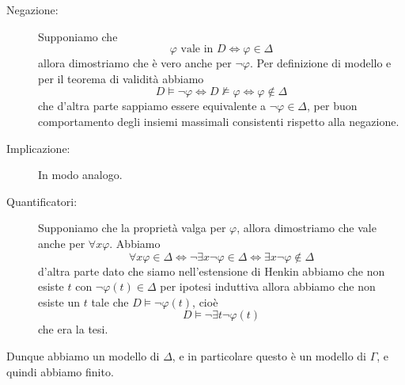 \documentclass[11pt]{scrartcl}
\begin{document}
 	\begin{description}
 		\item[Negazione:] Supponiamo che 
 		$$\varphi \text{ vale in } D \iff \varphi\in \Delta$$
 		allora dimostriamo che è vero anche per $\lnot\varphi$. Per definizione di modello e per il teorema di validità abbiamo
 		$$D\models \lnot\varphi \iff D\not\models \varphi \iff \varphi \not \in \Delta$$
 		che d'altra parte sappiamo essere equivalente a $\lnot\varphi\in \Delta$, per buon comportamento degli insiemi massimali consistenti rispetto alla negazione.
 		\item[Implicazione:] In modo analogo.
 		\item[Quantificatori:] Supponiamo che la proprietà valga per $\varphi$, allora dimostriamo che vale anche per $\forall x\varphi$. Abbiamo
 		$$\forall x\varphi \in \Delta\iff \lnot \exists x\lnot\varphi \in \Delta \iff \exists x\lnot\varphi \not\in \Delta$$
 		d'altra parte dato che siamo nell'estensione di Henkin abbiamo che non esiste $t$ con $\lnot\varphi(t)\in \Delta$ per ipotesi induttiva allora abbiamo che non esiste un $t$ tale che $D\models \lnot\varphi(t)$, cioè
 		$$D\models \lnot \exists t\lnot \varphi(t)$$
 		che era la tesi.
 	\end{description}
 	Dunque abbiamo un modello di $\Delta$, e in particolare questo è un modello di $\Gamma$, e quindi abbiamo finito.
\end{document}
